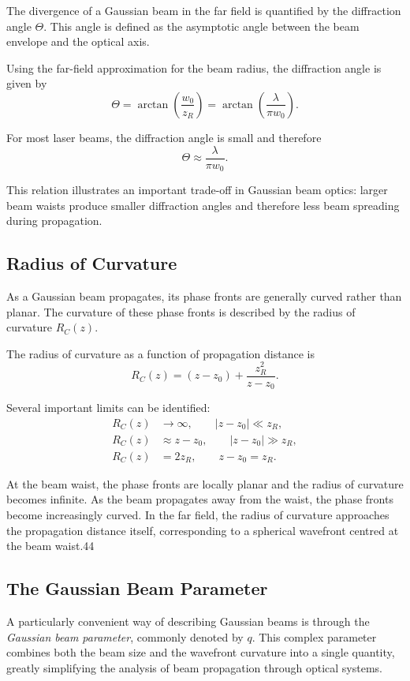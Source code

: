 \documentclass{report}
\begin{document}
The divergence of a Gaussian beam in the far field is quantified by the diffraction angle $\Theta$. This angle is defined as the asymptotic angle between the beam envelope and the optical axis.

Using the far-field approximation for the beam radius, the diffraction angle is given by
\begin{equation}
\Theta
=
\arctan\left(
\frac{w_0}{z_R}
\right)
=
\arctan\left(
\frac{\lambda}{\pi w_0}
\right).
\end{equation}

For most laser beams, the diffraction angle is small and therefore
\begin{equation}
\Theta
\approx
\frac{\lambda}{\pi w_0}.
\end{equation}

This relation illustrates an important trade-off in Gaussian beam optics: larger beam waists produce smaller diffraction angles and therefore less beam spreading during propagation.

\subsection{Radius of Curvature}

As a Gaussian beam propagates, its phase fronts are generally curved rather than planar. The curvature of these phase fronts is described by the radius of curvature $R_C(z)$.

The radius of curvature as a function of propagation distance is
\begin{equation}
R_C(z)
=
(z-z_0)
+
\frac{z_R^2}{z-z_0}.
\end{equation}

Several important limits can be identified:
\begin{align}
R_C(z) &\rightarrow \infty,
\qquad |z-z_0| \ll z_R, \\
R_C(z) &\approx z-z_0,
\qquad |z-z_0| \gg z_R, \\
R_C(z) &= 2z_R,
\qquad z-z_0=z_R.
\end{align}

At the beam waist, the phase fronts are locally planar and the radius of curvature becomes infinite. As the beam propagates away from the waist, the phase fronts become increasingly curved. In the far field, the radius of curvature approaches the propagation distance itself, corresponding to a spherical wavefront centred at the beam waist.44

\subsection{The Gaussian Beam Parameter}
A particularly convenient way of describing Gaussian beams is through the \textit{Gaussian beam parameter}, commonly denoted by $q$. This complex parameter combines both the beam size and the wavefront curvature into a single quantity, greatly simplifying the analysis of beam propagation through optical systems.
\end{document}
